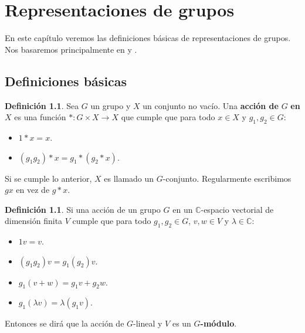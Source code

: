 \documentclass[12pt]{book}
\theoremstyle{definition}
\newtheorem{definition}[theorem]{Definición}
\newcounter{in}
\newcounter{ini}
\begin{document}
\chapter{Representaciones de grupos}
\label{cha:Representaciones de grupos}

En este capítulo veremos las definiciones básicas de representaciones
de grupos. Nos basaremos principalmente en \cite{MR882540} y
\cite{sagan2001symmetric}.

\section{Definiciones básicas}
\label{sec:basicas}

\begin{definition}
  Sea $G$ un grupo y $X$ un conjunto no vacío. Una \textbf{acción de}
  $G$ \textbf{en} $X$ es una función $\ast \colon G \times X \to X$
  que cumple que para todo $x \in X$ y $g_1,g_2 \in G$:
  \begin{itemize}
  \item $1 \ast x = x.$
    \item $(g_1g_2) \ast x = g_1 \ast (g_2 \ast x)$.
  \end{itemize}
\end{definition}

Si se cumple lo anterior, $X$ es llamado un $G$-conjunto. Regularmente
escribimos $gx$ en vez de $g \ast x$.

\begin{definition}
  Si una acción de un grupo $G$ en un $\mathbb{C}$-espacio vectorial de
  dimensión finita $V$ cumple que para todo $g_1,g_2 \in G$, $v,w \in V$ y
  $\lambda \in \mathbb{C}$:
  \begin{itemize}
  \item $1v = v.$
  \item $(g_1g_2)v = g_1(g_2)v.$
  \item $g_1(v+w) = g_1v + g_2w.$
    \item $g_1(\lambda v) = \lambda (g_1v).$
    \end{itemize}
    Entonces se dirá que la acción de $G$-lineal y $V$ es un $G$\textbf{-módulo}.
\end{definition}
\end{document}
